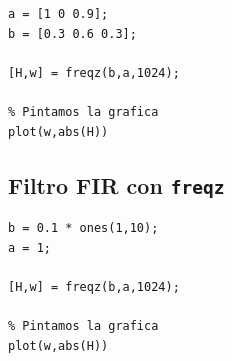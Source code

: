 \documentclass[11pt,a4paper]{article}
\begin{document}
\begin{lstlisting}[frame=single]
% Se definen los coeficientes de las ecuaciones en diferencias
a = [1 0 0.9];
b = [0.3 0.6 0.3];

[H,w] = freqz(b,a,1024);

% Pintamos la grafica
plot(w,abs(H))
\end{lstlisting}

\subsection{Filtro FIR con \texttt{freqz}}
\label{code9}

\begin{lstlisting}[frame=single]
% Se definen los coeficientes de las ecuaciones en diferencias
b = 0.1 * ones(1,10);
a = 1;

[H,w] = freqz(b,a,1024);

% Pintamos la grafica
plot(w,abs(H))
\end{lstlisting}
\end{document}
